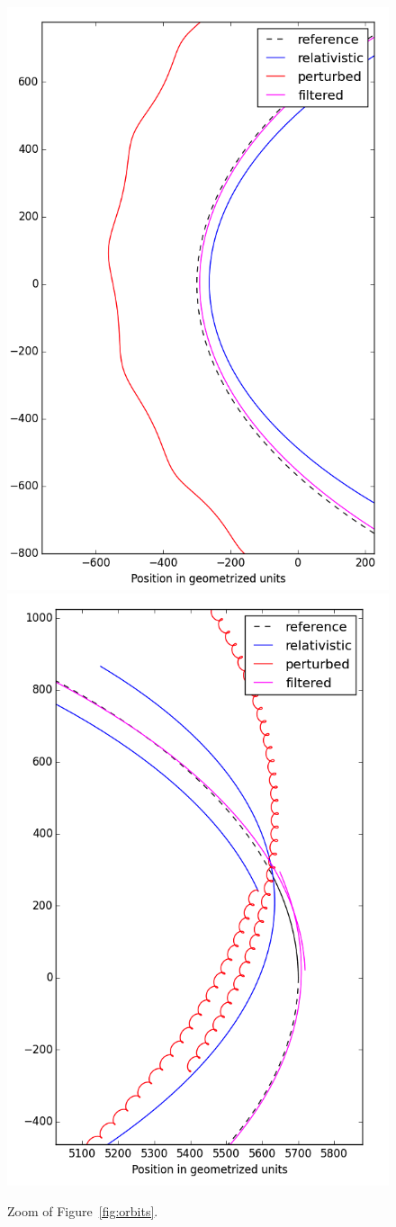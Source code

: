 \documentclass[usenatbib]{mnras}
\begin{document}
\begin{figure}
\centering
\includegraphics[height=.5\hsize]{zoom-peri.png}\quad
\includegraphics[height=.5\hsize]{zoom-apo.png}
\caption{\label{fig:zoom} Zoom of Figure~\ref{fig:orbits}.}
\end{figure}




\bsp    %
\label{lastpage}
\end{document}
